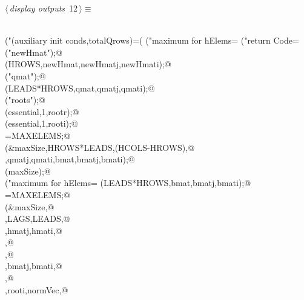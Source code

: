 \documentclass{article}
\begin{document}
\begin{flushleft} \small
\begin{minipage}{\linewidth}\label{scrap15}\raggedright\small
{} $\langle\,${\itshape display outputs}\nobreak\ {\footnotesize {12}}$\,\rangle\equiv$
\vspace{-1ex}
\begin{list}{}{} \item
\mbox{}\verb@@\\
\mbox{}\verb@printf("(auxiliary init conds,totalQrows)=(%d,%d)\n",aux,rowsInQ);@\\
\mbox{}\verb@printf("maximum for hElems=%d\n",maxSize);@\\
\mbox{}\verb@printf("return Code=%d\n",retCode);@\\
\mbox{}\verb@printf("newHmat\n");@\\
\mbox{}\verb@cPrintSparse(HROWS,newHmat,newHmatj,newHmati);@\\
\mbox{}\verb@printf("qmat\n");@\\
\mbox{}\verb@cPrintSparse(LEADS*HROWS,qmat,qmatj,qmati);@\\
\mbox{}\verb@printf("roots\n");@\\
\mbox{}\verb@cPrintMatrix(essential,1,rootr);@\\
\mbox{}\verb@cPrintMatrix(essential,1,rooti);@\\
\mbox{}\verb@maxSize=MAXELEMS;@\\
\mbox{}\verb@obtainSparseReducedForm(&maxSize,HROWS*LEADS,(HCOLS-HROWS),@\\
\mbox{}\verb@qmat,qmatj,qmati,bmat,bmatj,bmati);@\\
\mbox{}\verb@bumpSparseAim(maxSize);@\\
\mbox{}\verb@printf("maximum for hElems=%d\n",maxSize);@\\
\mbox{}\verb@cPrintSparse(LEADS*HROWS,bmat,bmatj,bmati);@\\
\mbox{}\verb@maxSize=MAXELEMS;@\\
\mbox{}\verb@satisfiesLinearSystemQ(&maxSize,@\\
\mbox{}\verb@HROWS,LAGS,LEADS,@\\
\mbox{}\verb@hmat,hmatj,hmati,@\\
\mbox{}\verb@aux,@\\
\mbox{}\verb@rowsInQ,@\\
\mbox{}\verb@bmat,bmatj,bmati,@\\
\mbox{}\verb@essential,@\\
\mbox{}\verb@rootr,rooti,normVec,@\\

\end{list}
\end{minipage}
\end{flushleft}
\end{document}
